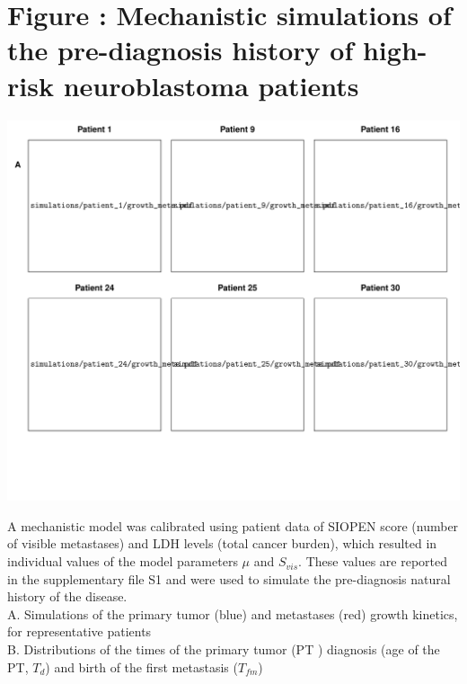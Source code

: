 \documentclass[11pt]{article}
\newcounter{fignb}  %
\begin{document}
\newpage
{}
\section{Figure : Mechanistic simulations of the pre-diagnosis history of high-risk neuroblastoma patients }
\spaceV
\begin{center}
\includegraphics[width=1\textwidth]{figure_4}
\end{center}
A mechanistic model was calibrated using patient data of SIOPEN score (number of visible metastases) and LDH levels (total cancer burden), which resulted in individual values of the model parameters $\mu$ and $S_{vis}$. These values are reported in the supplementary file S1 and were used to simulate the pre-diagnosis natural history of the disease.\\
A. Simulations of the primary tumor (blue) and metastases (red) growth kinetics, for representative patients\\
B. Distributions of the times of the primary tumor (PT ) diagnosis (age of the PT, $T_d$) and birth of the first metastasis ($T_{fm}$)

\newpage
{}
\end{document}
